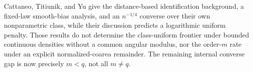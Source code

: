 Cattaneo, Titiunik, and Yu give the distance-based identification background, a fixed-law smooth-bias analysis, and an \(n^{-1/4}\) converse over their own nonparametric class, while their discussion predicts a logarithmic uniform penalty.  Those results do not determine the class-uniform frontier under bounded continuous densities without a common angular modulus, nor the order-\(m\) rate under an explicit normalized-coarea remainder.  The remaining internal converse gap is now precisely \(m<q\), not all \(m\neq q\).